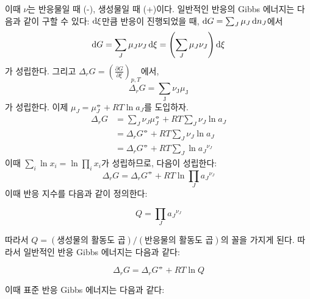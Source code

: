         이때 $\nu$는 반응물일 때 (-), 생성물일 때 (+)이다. 일반적인 반응의 Gibbs 에너지는 다음과 같이 구할 수 있다: $\operatorname{d\!} \xi$만큼 
        반응이 진행되었을 때, $\operatorname{d\!} G = \sum_J \mu_J \operatorname{d\!} n_J$에서
        \begin{equation*}
            \operatorname{d\!} G = \sum_J \mu_J \nu_J \operatorname{d\!} \xi = \left(\sum_J \mu_J \nu_J\right)\operatorname{d\!} \xi
        \end{equation*}
        가 성립한다. 그리고 $\Delta_r G=\left(\frac{\partial G}{\partial \xi}\right)_{p,T}$에서,
        \begin{equation*}
            \Delta_r G = \sum_\mathrm{J} \nu_\mathrm{J} \mu_\mathrm{J}
        \end{equation*}
        가 성립한다. 이제 $\mu_J = \mu_J^\circlehbar +RT\ln{a_J}$를 도입하자.
        \begin{equation*}
            \begin{aligned}
                \Delta_r G &= \sum_J \nu_J \mu_J^\circlehbar + RT\sum_J \nu_J \ln{a_J}\\
                &= \Delta_r G^\circlehbar +RT\sum_J \nu_J \ln{a_J}\\
                &= \Delta_r G^\circlehbar +RT\sum_J \ln{{a_J}^{\nu_J}}
            \end{aligned}
        \end{equation*}
        이때 $\sum_i \ln{x_i} = \ln{\prod_i x_i}$가 성립하므로, 다음이 성립한다:
        \begin{equation*}
            \Delta_r G = \Delta_r G^\circlehbar + RT\ln{\prod_J {a_J}^{\nu_J}}
        \end{equation*}
        이때 반응 지수를 다음과 같이 정의한다:
        \begin{defn}[반응 지수]
        \begin{equation*}
            Q = \prod_J {a_J}^{\nu_J}
        \end{equation*}
        \end{defn}
        따라서 $Q = \left(\text{생성물의 활동도 곱}\right)/\left(\text{반응물의 활동도 곱}\right)$의 꼴을 가지게 된다. 
        따라서 일반적인 반응 Gibbs 에너지는 다음과 같다:
        \begin{obs}
        \begin{equation*}
            \Delta_r G = \Delta_r G^\circlehbar + RT \ln{Q}
        \end{equation*}
        \end{obs}
        \par 이때 표준 반응 Gibbs 에너지는 다음과 같다:
